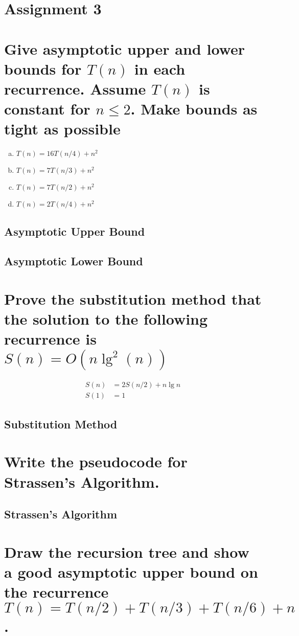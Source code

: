 
\section*{\Huge\bfseries Assignment 3}
\section{Give asymptotic upper and lower bounds for $T(n)$ in each recurrence. Assume $T(n)$ is constant for $n \leq 2$. Make bounds as tight as possible}
\begin{enumerate}[a.]
	\item $T(n) = 16	T(n/4) + n^2$
	\item $T(n) = 7		T(n/3) + n^2$
	\item $T(n) = 7		T(n/2) + n^2$
	\item $T(n) = 2		T(n/4) + n^2$
\end{enumerate}
\subsection{Asymptotic Upper Bound}
\subsection{Asymptotic Lower Bound}

\section{Prove the substitution method that the solution to the following recurrence is $S(n) = O(n\lg^2(n))$}
\begin{align*}
	S(n) &= 2S(n/2) + n \lg n \\
	S(1) &= 1
\end{align*}
\subsection{Substitution Method}

\section{Write the pseudocode for Strassen's Algorithm.}
\subsection{Strassen's Algorithm}

\section{Draw the recursion tree and show a good asymptotic upper bound on the recurrence $T(n) = T(n/2) + T(n/3) + T(n/6) + n$.}
